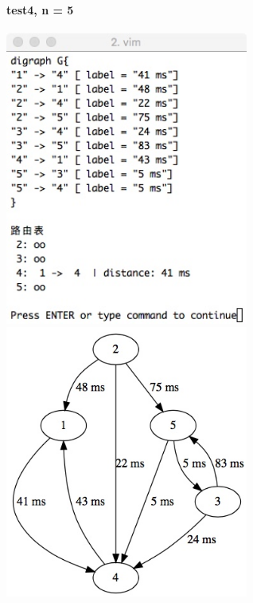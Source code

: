 \documentclass{article}
\begin{document}
		\paragraph{test4, n = 5}
			\begin{center}
			\includegraphics[width = 8cm]{data52.jpeg}
			\includegraphics[width = 8cm]{data52viz.jpeg}
			\end{center}
			\clearpage
\end{document}
